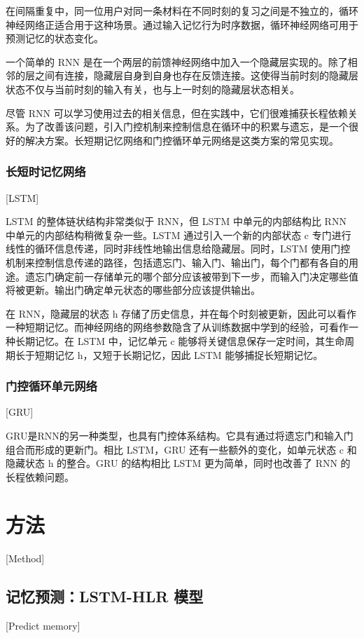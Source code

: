在间隔重复中，同一位用户对同一条材料在不同时刻的复习之间是不独立的，循环神经网络正适合用于这种场景。通过输入记忆行为时序数据，循环神经网络可用于预测记忆的状态变化。

一个简单的 RNN 是在一个两层的前馈神经网络中加入一个隐藏层实现的。除了相邻的层之间有连接，隐藏层自身到自身也存在反馈连接。这使得当前时刻的隐藏层状态不仅与当前时刻的输入有关，也与上一时刻的隐藏层状态相关。

尽管 RNN 可以学习使用过去的相关信息，但在实践中，它们很难捕获长程依赖关系。为了改善该问题，引入门控机制来控制信息在循环中的积累与遗忘，是一个很好的解决方案。长短期记忆网络和门控循环单元网络是这类方案的常见实现。

\subsection{长短时记忆网络}[LSTM]

LSTM 的整体链状结构非常类似于 RNN，但 LSTM 中单元的内部结构比 RNN 中单元的内部结构稍微复杂一些。LSTM 通过引入一个新的内部状态 c 专门进行线性的循环信息传递，同时非线性地输出信息给隐藏层。同时，LSTM 使用门控机制来控制信息传递的路径，包括遗忘门、输入门、输出门，每个门都有各自的用途。遗忘门确定前一存储单元的哪个部分应该被带到下一步，而输入门决定哪些值将被更新。输出门确定单元状态的哪些部分应该提供输出。

在 RNN，隐藏层的状态 h 存储了历史信息，并在每个时刻被更新，因此可以看作一种短期记忆。而神经网络的网络参数隐含了从训练数据中学到的经验，可看作一种长期记忆。在 LSTM 中，记忆单元 c 能够将关键信息保存一定时间，其生命周期长于短期记忆 h，又短于长期记忆，因此 LSTM 能够捕捉长短期记忆。

\subsection{门控循环单元网络}[GRU]

GRU是RNN的另一种类型，也具有门控体系结构。它具有通过将遗忘门和输入门组合而形成的更新门。相比 LSTM，GRU 还有一些额外的变化，如单元状态 c 和隐藏状态 h 的整合。GRU 的结构相比 LSTM 更为简单，同时也改善了 RNN 的长程依赖问题。

\chapter{方法}[Method]

\section{记忆预测：LSTM-HLR 模型}[Predict memory]

